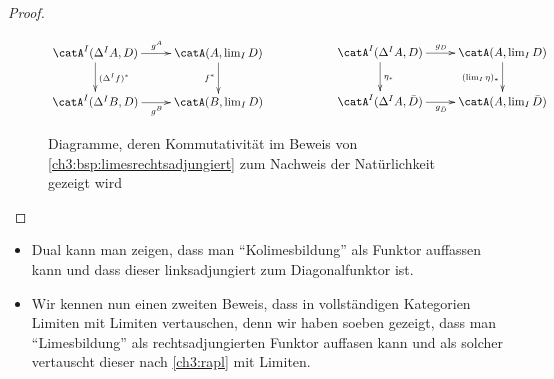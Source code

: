 \begin{proof}
\begin{figure}
        \begin{equation*}
            \begin{gathered}
                \xymatrix{
                    \catA^I(\Delta^I A, D) \ar[r]^{g^A} \ar[d]^{(\Delta^I f)^*} &
                    \catA(A, \lim_I D) \ar[d]_{f^*}
                    \\
                    \catA^I(\Delta^I B, D) \ar[r]_{g^B} & \catA(B, \lim_I D)
                }
            \end{gathered}
            \hspace{2cm}
            \begin{gathered}
                \xymatrix{
                    \catA^I(\Delta^I A, D) \ar[r]^{g_D} \ar[d]^{\eta_\ast} &
                    \catA(A, \lim_I D) \ar[d]_{(\lim_I\eta)_\ast}
                    \\
                    \catA^I(\Delta^I A, \bar D) \ar[r]_{g_{\bar D}} &
                    \catA(A, \lim_I\bar D)
                }
            \end{gathered}
        \end{equation*}
        \caption{Diagramme, deren Kommutativität im Beweis von
            \cref{ch3:bsp:limesrechtsadjungiert} zum Nachweis der Natürlichkeit
            gezeigt wird}
        \label{ch3:fig:limrechtsadjdiagramme}
    \end{figure}
\end{proof}

\begin{thBemerkung}\hfill
    \begin{itemize}
        \item
            Dual kann man zeigen, dass man \enquote{Kolimesbildung}
            als Funktor auffassen kann und dass dieser linksadjungiert
            zum Diagonalfunktor ist.
            
        \item
            Wir kennen nun einen zweiten Beweis, dass in vollständigen
            Kategorien Limiten mit Limiten vertauschen, denn wir haben
            soeben gezeigt, dass man \enquote{Limesbildung} als
            rechtsadjungierten Funktor auffasen kann und als solcher
            vertauscht dieser nach \cref{ch3:rapl} mit Limiten.
    \end{itemize}
\end{thBemerkung}
